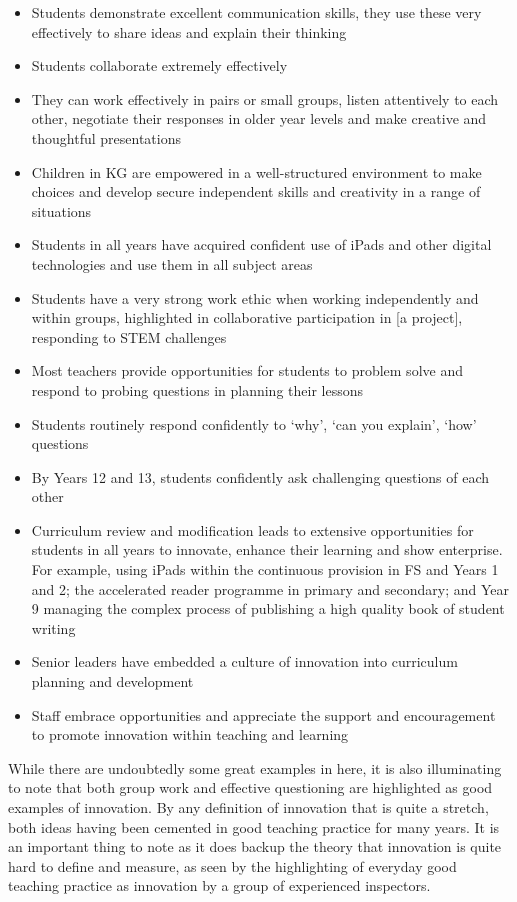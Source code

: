\begin{itemize}
\item Students demonstrate excellent communication skills, they use these very effectively to share ideas and explain their thinking
\item Students collaborate extremely effectively
\item They can work effectively in pairs or small groups, listen attentively to each other, negotiate their responses in older year levels and make creative and thoughtful presentations
\item Children in KG are empowered in a well-structured environment to make choices and develop secure independent skills and creativity in a range of situations
\item Students in all years have acquired confident use of iPads and other digital technologies and use them in all subject areas
\item Students have a very strong work ethic when working independently and within groups, highlighted in collaborative participation in [a project], responding to STEM challenges
\item Most teachers provide opportunities for students to problem solve and respond to probing questions in planning their lessons
\item Students routinely respond confidently to ‘why’, ‘can you explain’, ‘how’ questions
\item By Years 12 and 13, students confidently ask challenging questions of each other
\item Curriculum review and modification leads to extensive opportunities for students in all years to innovate, enhance their learning and show enterprise. For example, using iPads within the continuous provision in FS and Years 1 and 2; the accelerated reader programme in primary and secondary; and Year 9 managing the complex process of publishing a high quality book of student writing
\item Senior leaders have embedded a culture of innovation into curriculum planning and development
\item Staff embrace opportunities and appreciate the support and encouragement to promote innovation within teaching and learning
\end{itemize}


While there are undoubtedly some great examples in here, it is also illuminating to note that both group work and effective questioning are highlighted as good examples of innovation. By any definition of innovation that is quite a stretch, both ideas having been cemented in good teaching practice for many years. It is an important thing to note as it does backup the theory that innovation is quite hard to define and measure, as seen by the highlighting of everyday good teaching practice as innovation by a group of experienced inspectors.

